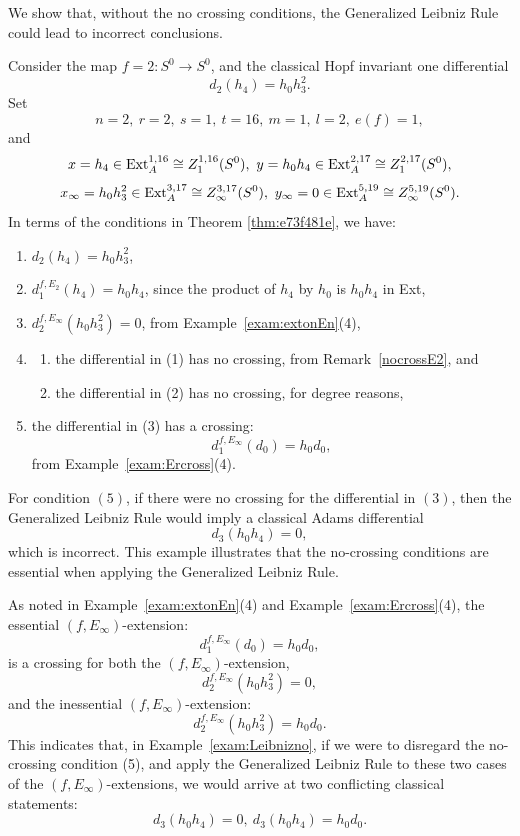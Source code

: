 \documentclass{amsart}
\numberwithin{equation}{section}
\begin{document}
\begin{example} \label{exam:Leibnizno}
    We show that, without the no crossing conditions, the Generalized Leibniz Rule could lead to incorrect conclusions. 

    Consider the map $f=2: S^0 \rightarrow S^0$, and the classical Hopf invariant one differential
    $$d_2(h_4) = h_0 h_3^2.$$
    Set $$n=2, \ r=2, \ s=1, \ t=16, \ m=1, \ l=2, \ e(f)=1,$$
        and 
        $$x=h_4 \in \mathrm{Ext}_A^{1,16} \cong Z_1^{1,16}(S^0), \ y=h_0h_4 \in \mathrm{Ext}_A^{2,17} \cong Z_1^{2,17}(S^0),$$
        $$x_\infty=h_0h_3^2 \in \mathrm{Ext}_A^{3,17} \cong Z_\infty^{3,17}(S^0), \ y_\infty=0 \in \mathrm{Ext}_A^{5,19} \cong Z_\infty^{5,19}(S^0).$$
In terms of the conditions in Theorem \ref{thm:e73f481e}, we have:
 \begin{enumerate}
      \item $d_2(h_4) = h_0h_3^2$,
      \item $d_1^{f, E_2}(h_4) = h_0h_4$, since the product of $h_4$ by $h_0$ is $h_0h_4$ in Ext,
      \item $d_2^{f, E_\infty} (h_0h_3^2) = 0$, from Example~\ref{exam:extonEn}(4),
      \item 
      \begin{enumerate}
          \item the differential in (1) has no crossing, from Remark~\ref{nocrossE2}, and
          \item the differential in (2) has no crossing, for degree reasons, 
      \end{enumerate}
      \item the differential in (3) has a crossing:
      $$d_1^{f, E_\infty} (d_0) = h_0 d_0,$$
      from Example~\ref{exam:Ercross}(4).
      \end{enumerate}
      For condition $(5)$, if there were no crossing for the differential in $(3)$, then the Generalized Leibniz Rule would imply a classical Adams differential
      $$d_3(h_0h_4) = 0,$$
      which is incorrect. This example illustrates that the no-crossing conditions are essential when applying the Generalized Leibniz Rule.
\end{example}

\begin{remark}
    As noted in Example~\ref{exam:extonEn}(4) and Example~\ref{exam:Ercross}(4), the essential $(f, E_\infty)$-extension:
        $$d_1^{f, E_\infty} (d_0) = h_0 d_0,$$
        is a crossing for both the $(f, E_\infty)$-extension,
        $$d_2^{f, E_\infty} (h_0 h_3^2) = 0,$$
        and the inessential $(f, E_\infty)$-extension: 
        $$d_2^{f, E_\infty} (h_0 h_3^2) = h_0 d_0.$$
        This indicates that, in Example~\ref{exam:Leibnizno}, if we were to disregard the no-crossing condition (5), and apply the Generalized Leibniz Rule to these two cases of the $(f, E_\infty)$-extensions, we would arrive at two conflicting classical statements:
$$d_3(h_0h_4) = 0, \ d_3(h_0h_4) = h_0 d_0.$$
\end{remark}
\end{document}
